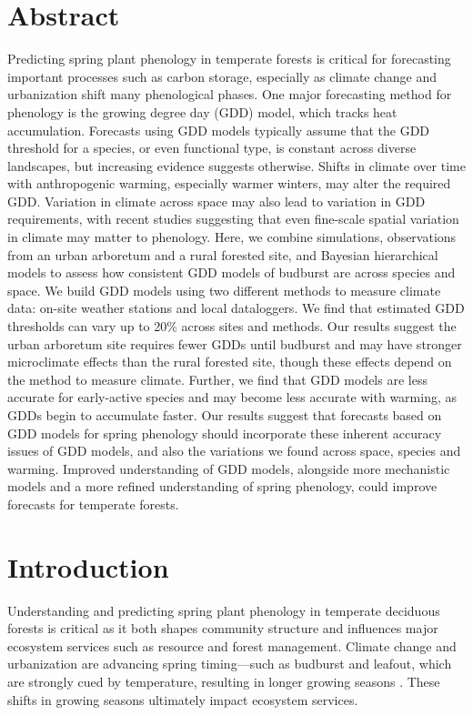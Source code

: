 \documentclass{article}\usepackage[]{graphicx}\usepackage[]{color}
\begin{document}
\section*{Abstract} 
Predicting spring plant phenology in temperate forests is critical for forecasting important processes such as carbon storage, especially as climate change and urbanization shift many phenological phases. One major forecasting method for phenology is the growing degree day (GDD) model, which tracks heat accumulation. Forecasts using GDD models typically assume that the GDD threshold for a species, or even functional type, is constant across diverse landscapes, but increasing evidence suggests otherwise. Shifts in climate over time with anthropogenic warming, especially warmer winters, may alter the required GDD. Variation in climate across space may also lead to variation in GDD requirements, with recent studies suggesting that even fine-scale spatial variation in climate may matter to phenology. Here, we combine simulations, observations from an urban arboretum and a rural forested site, and Bayesian hierarchical models to assess how consistent GDD models of budburst are across species and space. We build GDD models using two different methods to measure climate data: on-site weather stations and local dataloggers. We find that estimated GDD thresholds can vary up to 20\% across sites and methods. Our results suggest the urban arboretum site requires fewer GDDs until budburst and may have stronger microclimate effects than the rural forested site, though these effects depend on the method to measure climate. Further, we find that GDD models  are less accurate for early-active species and may become less accurate with warming, as GDDs begin to accumulate faster. Our results suggest that forecasts based on GDD models for spring phenology should incorporate these inherent accuracy issues of GDD models, and also the variations we found across space, species and warming. Improved understanding of GDD models, alongside more mechanistic models and a more refined understanding of spring phenology, could improve forecasts for temperate forests.  

\section*{Introduction}

Understanding and predicting spring plant phenology in temperate deciduous forests is critical as it both shapes community structure and influences major ecosystem services such as resource and forest management. Climate change and urbanization are advancing spring timing---such as budburst and leafout, which are strongly cued by temperature, resulting in longer growing seasons \citep{Chuine2001}. These shifts in growing seasons ultimately impact ecosystem services. 
 
\end{document}
